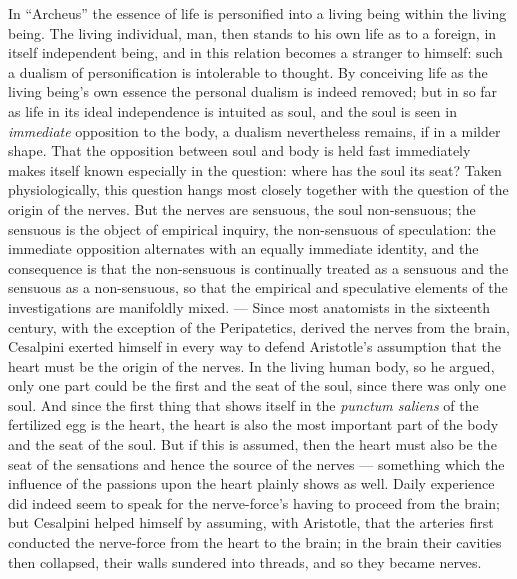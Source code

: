 \documentclass[12pt,a4paper]{book}
\begin{document}
In ``Archeus'' the essence of life is personified into a living being within
the living being. The living individual, man, then stands to his own life as to
a foreign, in itself independent being, and in this relation becomes a stranger
to himself: such a dualism of personification is intolerable to thought. By
conceiving life as the living being's own essence the personal dualism is
indeed removed; but in so far as life in its ideal independence is intuited as
soul, and the soul is seen in \emph{immediate} opposition to the body, a
dualism nevertheless remains, if in a milder shape. That the opposition between
soul and body is held fast immediately makes itself known especially in the
question: where has the soul its seat? Taken physiologically, this question
hangs most closely together with the question of the origin of the nerves. But
the nerves are sensuous, the soul non-sensuous; the sensuous is the object of
empirical inquiry, the non-sensuous of speculation: the immediate opposition
alternates with an equally immediate identity, and the consequence is that the
non-sensuous is continually treated as a sensuous and the sensuous as a
non-sensuous, so that the empirical and speculative elements of the
investigations are manifoldly mixed. --- Since most anatomists in the sixteenth
century, with the exception of the Peripatetics, derived the nerves from the
brain, Cesalpini exerted himself in every way to defend Aristotle's assumption
that the heart must be the origin of the nerves. In the living human body,
so he argued, only one part could be the first and the seat of the soul, since
there was only one soul. And since the first thing that shows itself in the
\textit{punctum saliens} of the fertilized egg is the heart, the heart is also
the most important part of the body and the seat of the soul. But if this is
assumed, then the heart must also be the seat of the sensations and hence the
source of the nerves --- something which the influence of the passions upon the
heart plainly shows as well. Daily experience did indeed seem to speak for the
nerve-force's having to proceed from the brain; but Cesalpini helped himself by
assuming, with Aristotle, that the arteries first conducted the nerve-force
from the heart to the brain; in the brain their cavities then collapsed, their
walls sundered into threads, and so they became nerves.
\end{document}
